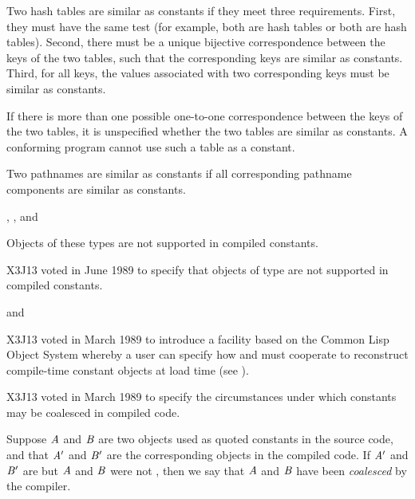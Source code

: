 \begin{newer}
\begin{flushdesc}
  Two hash tables are similar as constants if they meet
  three requirements.
  First, they must have the same test (for example, both are  hash tables
  or both are  hash tables).
  Second, there must be a unique bijective correspondence between the keys of
      the two tables, such that the corresponding keys are similar as
      constants.
  Third, for all keys, the values associated with two corresponding keys
      must be similar as constants.

  If there is more than one possible one-to-one correspondence between
  the keys of the two tables, it is unspecified whether the two
  tables are similar as constants.  A conforming
  program cannot use such a table as a constant.

\item[\cdf{pathname}]

  Two pathnames are similar as constants if all corresponding pathname
  components are similar as constants.

\item[\cdf{stream}, \cdf{readtable}, and \cdf{method}]

  Objects of these types are not supported in compiled constants.

\item[\cdf{function}]


   X3J13 voted in June 1989 
   to specify that objects of type 
   are not supported in compiled constants.

\item[\cdf{structure} and \cdf{standard-object}]

   X3J13 voted in March 1989  to introduce a facility
based on the Common Lisp Object System
whereby a user can specify how  and 
must cooperate to reconstruct compile-time constant objects at load time
(see ).
\end{flushdesc}

   X3J13 voted in March 1989  to specify
the circumstances under which constants may be coalesced in compiled code.

Suppose ${\it A}$ and ${\it B}$ are two
objects used as quoted constants in the source code, and that ${\it A}'$ and
${\it B}'$ are the corresponding objects in the compiled code.  If ${\it A}'$ and ${\it B}'$
are  but ${\it A}$ and ${\it B}$ were not , then we say that ${\it A}$ and ${\it B}$ have been
{\it coalesced} by the compiler.


\end{newer}
